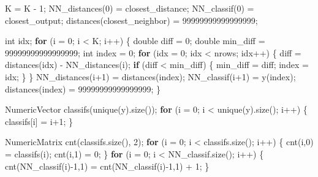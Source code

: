 \documentclass[]{article}
\newenvironment{Shaded}{\begin{snugshade}}{\end{snugshade}}
\newcommand{\ControlFlowTok}[1]{\textcolor[rgb]{0.13,0.29,0.53}{\textbf{#1}}}
\newcommand{\DataTypeTok}[1]{\textcolor[rgb]{0.13,0.29,0.53}{#1}}
\newcommand{\DecValTok}[1]{\textcolor[rgb]{0.00,0.00,0.81}{#1}}
\newcommand{\NormalTok}[1]{#1}
\begin{document}
\begin{Shaded}
\begin{Highlighting}[]
\NormalTok{    K = K - }\DecValTok{1}\NormalTok{;}
\NormalTok{    NN_distances(}\DecValTok{0}\NormalTok{) = closest_distance;}
\NormalTok{    NN_classif(}\DecValTok{0}\NormalTok{) = closest_output;}
\NormalTok{    distances(closest_neighbor) = }\DecValTok{99999999999999999}\NormalTok{;}
    
    \DataTypeTok{int}\NormalTok{ idx;}
    \ControlFlowTok{for}\NormalTok{ (i = }\DecValTok{0}\NormalTok{; i < K; i++) \{}
      \DataTypeTok{double}\NormalTok{ diff = }\DecValTok{0}\NormalTok{;}
      \DataTypeTok{double}\NormalTok{ min_diff = }\DecValTok{99999999999999999}\NormalTok{;}
      \DataTypeTok{int}\NormalTok{ index = }\DecValTok{0}\NormalTok{;}
      \ControlFlowTok{for}\NormalTok{ (idx = }\DecValTok{0}\NormalTok{; idx < nrows; idx++) \{}
\NormalTok{        diff = distances(idx) - NN_distances(i);}
        \ControlFlowTok{if}\NormalTok{ (diff < min_diff) \{}
\NormalTok{          min_diff = diff;}
\NormalTok{          index = idx;}
\NormalTok{        \}}
\NormalTok{      \}}
\NormalTok{      NN_distances(i+}\DecValTok{1}\NormalTok{) = distances(index);}
\NormalTok{      NN_classif(i+}\DecValTok{1}\NormalTok{) = y(index);}
\NormalTok{      distances(index) = }\DecValTok{99999999999999999}\NormalTok{;}
\NormalTok{    \}}
    
\NormalTok{    NumericVector classifs(unique(y).size());}
    \ControlFlowTok{for}\NormalTok{ (i = }\DecValTok{0}\NormalTok{; i < unique(y).size(); i++) \{}
\NormalTok{      classifs[i] = i+}\DecValTok{1}\NormalTok{;}
\NormalTok{    \}}

\NormalTok{    NumericMatrix cnt(classifs.size(), }\DecValTok{2}\NormalTok{);}
    \ControlFlowTok{for}\NormalTok{ (i = }\DecValTok{0}\NormalTok{; i < classifs.size(); i++) \{}
\NormalTok{      cnt(i,}\DecValTok{0}\NormalTok{) = classifs(i);}
\NormalTok{      cnt(i,}\DecValTok{1}\NormalTok{) = }\DecValTok{0}\NormalTok{;}
\NormalTok{    \}}
    \ControlFlowTok{for}\NormalTok{ (i = }\DecValTok{0}\NormalTok{; i < NN_classif.size(); i++) \{}
\NormalTok{      cnt(NN_classif(i)-}\DecValTok{1}\NormalTok{,}\DecValTok{1}\NormalTok{) = cnt(NN_classif(i)-}\DecValTok{1}\NormalTok{,}\DecValTok{1}\NormalTok{) + }\DecValTok{1}\NormalTok{;}
\NormalTok{    \}}


\end{Highlighting}
\end{Shaded}
\end{document}
